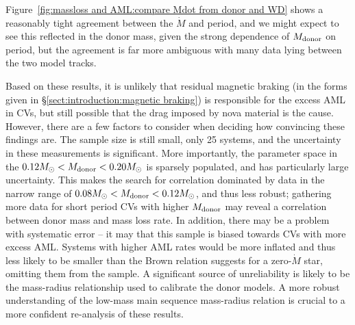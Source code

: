 Figure~\ref{fig:massloss and AML:compare Mdot from donor and WD} shows a reasonably tight agreement between the $\dot M$ and period, and we might expect to see this reflected in the donor mass, given the strong dependence of $M_{\rm donor}$ on period, but the agreement is far more ambiguous with many data lying between the two model tracks.

Based on these results, it is unlikely that residual magnetic braking (in the forms given in \S\ref{sect:introduction:magnetic braking}) is responsible for the excess AML in CVs, but still possible that the drag imposed by nova material is the cause.
However, there are a few factors to consider when deciding how convincing these findings are.
The sample size is still small, only 25 systems, and the uncertainty in these measurements is significant.
More importantly, the parameter space in the $0.12 M_\odot < M_{\rm donor} < 0.20 M_\odot$ is sparsely populated, and has particularly large uncertainty. This makes the search for correlation dominated by data in the narrow range of $0.08 M_\odot < M_{\rm donor} < 0.12 M_\odot$, and thus less robust; gathering more data for short period CVs with higher $M_{\rm donor}$ may reveal a correlation between donor mass and mass loss rate.
In addition, there may be a problem with systematic error -- it may that this sample is biased towards CVs with more excess AML. Systems with higher AML rates would be more inflated and thus less likely to be smaller than the Brown relation suggests for a zero-$\dot M$ star, omitting them from the sample.
A significant source of unreliability is likely to be the mass-radius relationship used to calibrate the donor models. A more robust understanding of the low-mass main sequence mass-radius relation is crucial to a more confident re-analysis of these results.

